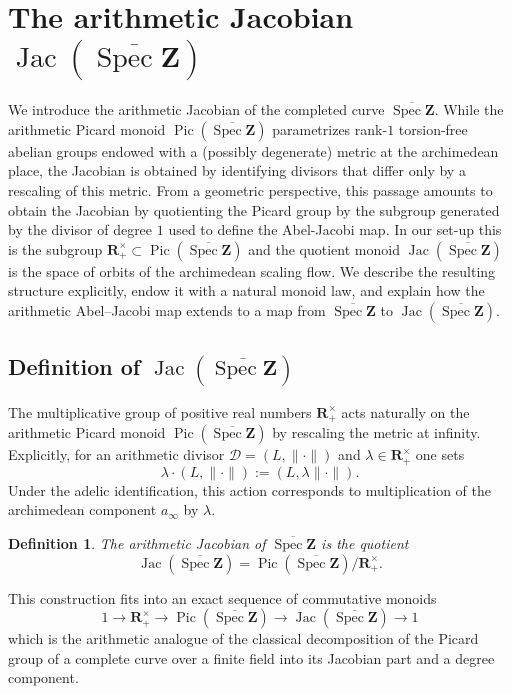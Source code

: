 \documentclass[11pt,a4paper]{article}
\newcommand{\Z}{\mathbf{Z}}
\newcommand{\R}{\mathbf{R}}
\def\spzb{\overline{\Spec \Z}}
\newcommand{\Spec}{\operatorname{Spec}}
\def\Pic{\operatorname{Pic}}
\def\Jac{\operatorname{Jac}}
\theoremstyle{plain}
\newtheorem{defn}[thm]{Definition}
\theoremstyle{definition} %
\begin{document}




\section{The arithmetic Jacobian $\Jac(\spzb)$}\label{jacob}

We introduce the arithmetic Jacobian of the completed curve
$\spzb$.
While the arithmetic Picard monoid $\Pic(\spzb)$ parametrizes rank-$1$
torsion-free abelian groups endowed with a (possibly degenerate) metric at the
archimedean place, the Jacobian is obtained by identifying divisors that differ only
by a rescaling of this metric.
From a geometric perspective, this passage amounts to obtain the Jacobian by quotienting the Picard group by the subgroup generated by the  divisor of degree $1$ used to define the Abel-Jacobi map. In our set-up this  is the subgroup $\R_+^\times\subset \Pic(\spzb)$ and  the quotient monoid $\Jac(\spzb)$ is the space
of orbits of the archimedean scaling flow.
We describe the resulting structure explicitly, endow it with a natural monoid law,
and explain how the arithmetic Abel--Jacobi map extends to a map from $\spzb$ to  $\Jac(\spzb)$.



\subsection{Definition of $\Jac(\spzb)$}

The multiplicative group of positive real numbers $\R_+^\times$ acts naturally on the
arithmetic Picard monoid $\Pic(\spzb)$ by rescaling the metric at infinity.
Explicitly, for an arithmetic divisor $\mathcal D=(L,\|\cdot\|)$ and $\lambda\in\R_+^\times$
one sets
\[
\lambda\cdot(L,\|\cdot\|):=(L,\lambda\|\cdot\|).
\]
Under the adelic identification, this action corresponds to multiplication of the
archimedean component $a_\infty$ by $\lambda$.



\begin{defn}
The \emph{arithmetic Jacobian} of $\spzb$ is  the quotient
\[
\Jac(\spzb)=\Pic(\spzb)\big/\R_+^\times.
\]
\end{defn}
This construction fits into an exact sequence of commutative monoids
$$
1\to \R_+^\times\to \Pic(\spzb)\to \Jac(\spzb)\to 1
$$
which is the arithmetic analogue of the classical decomposition of the Picard group
of a complete curve over a finite field into its Jacobian part and a degree
component.
\end{document}
